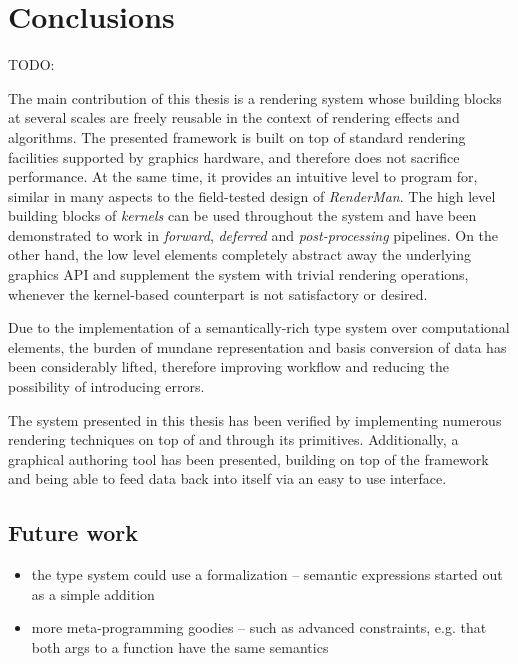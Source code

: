 
\chapter{ Conclusions }
\label{Chapter7}

TODO:

The main contribution of this thesis is a rendering system whose building blocks at several scales are freely reusable in the context of rendering effects and algorithms. The presented framework is built on top of standard rendering facilities supported by graphics hardware, and therefore does not sacrifice performance. At the same time, it provides an intuitive level to program for, similar in many aspects to the field-tested design of \emph{RenderMan}. The high level building blocks of \emph{kernels} can be used throughout the system and have been demonstrated to work in \emph{forward}, \emph{deferred} and \emph{post-processing} pipelines. On the other hand, the low level elements completely abstract away the underlying graphics API and supplement the system with trivial rendering operations, whenever the kernel-based counterpart is not satisfactory or desired.

Due to the implementation of a semantically-rich type system over computational elements, the burden of mundane representation and basis conversion of data has been considerably lifted, therefore improving workflow and reducing the possibility of introducing errors.

The system presented in this thesis has been verified by implementing numerous rendering techniques on top of and through its primitives. Additionally, a graphical authoring tool has been presented, building on top of the framework and being able to feed data back into itself via an easy to use interface.

\section{Future work}

\begin{itemize}
\item the type system could use a formalization -- semantic expressions started out as a simple addition
\item more meta-programming goodies -- such as advanced constraints, e.g. that both args to a function have the same semantics
\end{itemize}
